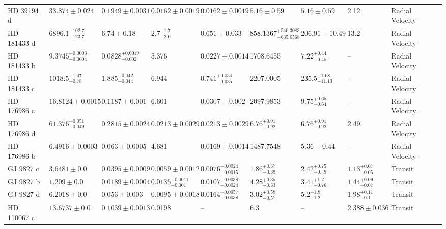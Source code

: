 \begin{tabular}{llllllllll}
HD 39194 d & $33.874 \pm 0.024$ & $0.1949 \pm 0.0031$ & $0.0162 \pm 0.0019$ & $0.0162 \pm 0.0019$ & $5.16 \pm 0.59$ & $5.16 \pm 0.59$ & 2.12 & Radial Velocity & \cite{STANDING_ET_AL_2026} \\
HD 181433 d & $6896.1^{+102.7}_{-123.7}$ & $6.74 \pm 0.18$ & $2.7^{+1.7}_{-2.0}$ & $0.651 \pm 0.033$ & $858.1367^{+540.3083}_{-635.6568}$ & $206.91 \pm 10.49$ & 13.2 & Radial Velocity & \cite{STANDING_ET_AL_2026} \\
HD 181433 b & $9.3745^{+0.0003}_{-0.0004}$ & $0.0828^{+0.0019}_{-0.002}$ & 5.376 & $0.0227 \pm 0.0014$ & 1708.6455 & $7.22^{+0.44}_{-0.45}$ & -- & Radial Velocity & \cite{STANDING_ET_AL_2026} \\
HD 181433 c & $1018.5^{+1.47}_{-0.78}$ & $1.885^{+0.042}_{-0.044}$ & 6.944 & $0.741^{+0.034}_{-0.035}$ & 2207.0005 & $235.5^{+10.8}_{-11.13}$ & -- & Radial Velocity & \cite{STANDING_ET_AL_2026} \\
HD 176986 c & $16.8124 \pm 0.0015$ & $0.1187 \pm 0.001$ & 6.601 & $0.0307 \pm 0.002$ & 2097.9853 & $9.75^{+0.65}_{-0.64}$ & -- & Radial Velocity & \cite{NARI_ET_AL_2026} \\
HD 176986 d & $61.376^{+0.051}_{-0.049}$ & $0.2815 \pm 0.0024$ & $0.0213 \pm 0.0029$ & $0.0213 \pm 0.0029$ & $6.76^{+0.91}_{-0.92}$ & $6.76^{+0.91}_{-0.92}$ & 2.49 & Radial Velocity & \cite{NARI_ET_AL_2026} \\
HD 176986 b & $6.4916 \pm 0.0003$ & $0.063 \pm 0.0005$ & 4.681 & $0.0169 \pm 0.0014$ & 1487.7548 & $5.36 \pm 0.44$ & -- & Radial Velocity & \cite{NARI_ET_AL_2026} \\
GJ 9827 c & $3.6481 \pm 0.0$ & $0.0395 \pm 0.0009$ & $0.0059 \pm 0.0012$ & $0.0076^{+0.0024}_{-0.0015}$ & $1.86^{+0.37}_{-0.39}$ & $2.42^{+0.75}_{-0.49}$ & $1.13^{+0.07}_{-0.05}$ & Transit & \cite{PASSEGGER_ET_AL_2024} \\
GJ 9827 b & $1.209 \pm 0.0$ & $0.0189 \pm 0.0004$ & $0.0135^{+0.0011}_{-0.001}$ & $0.0107^{+0.0038}_{-0.0024}$ & $4.28^{+0.35}_{-0.33}$ & $3.41^{+1.2}_{-0.76}$ & $1.44^{+0.09}_{-0.07}$ & Transit & \cite{PASSEGGER_ET_AL_2024} \\
GJ 9827 d & $6.2018 \pm 0.0$ & $0.053 \pm 0.003$ & $0.0095 \pm 0.0018$ & $0.0164^{+0.0057}_{-0.0038}$ & $3.02^{+0.58}_{-0.57}$ & $5.2^{+1.8}_{-1.2}$ & $1.98^{+0.11}_{-0.1}$ & Transit & \cite{PIAULET_GHORAYEB_ET_AL__2024} \\
HD 110067 c & $13.6737 \pm 0.0$ & $0.1039 \pm 0.0013$ & 0.0198 & -- & 6.3 & -- & $2.388 \pm 0.036$ & Transit & \cite{LUQUE_ET_AL__2023} \\

\end{tabular}
